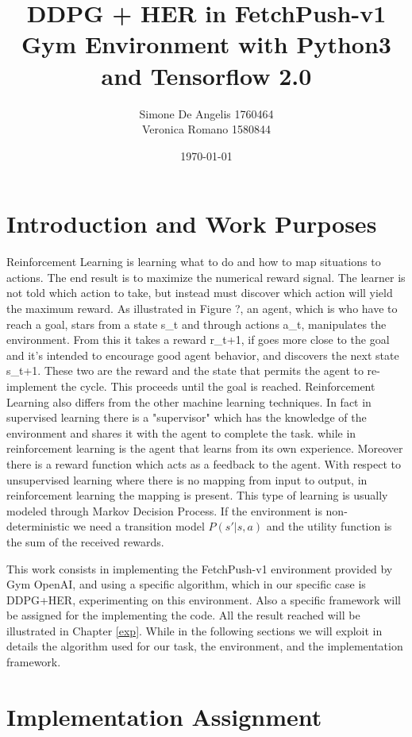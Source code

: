 \documentclass[a4paper]{report}
\title{DDPG + HER in FetchPush-v1 Gym Environment with Python3 and Tensorflow 2.0}
\author{Simone De Angelis 1760464\\ Veronica Romano 1580844}
\date{\today}
\begin{document}
\maketitle

\chapter{Introduction and Work Purposes}
Reinforcement Learning is learning what to do and how to map situations to actions. The end result is to maximize the numerical reward signal. The learner is not told which action to take, but instead must discover which action will yield the maximum reward.
As illustrated in Figure ?, an agent, which is who have to reach a goal, stars from a state s\_t and through actions a\_t, manipulates the environment. From this it takes a reward r\_t+1, if goes more close to the goal and it's intended to encourage good agent behavior, and discovers the next state s\_t+1. These two are the reward and the state that permits the agent to re-implement the cycle. This proceeds until the goal is reached. Reinforcement Learning also differs from the other machine learning techniques. In fact in supervised learning there is a "supervisor" which has the knowledge of the environment and shares it with the agent to complete the task. while in reinforcement learning is the agent that learns from its own experience. Moreover there is a reward function which acts as a feedback to the agent. With respect to unsupervised learning where there is no mapping from input to output, in reinforcement learning the mapping is present. This type of learning is usually modeled through Markov Decision Process. If the environment is non-deterministic we need a transition model $P(s'|s,a)$ and the utility function is the sum of the received rewards.

This work consists in implementing the FetchPush-v1 environment provided by Gym OpenAI, and using a specific algorithm, which in our specific case is DDPG+HER, experimenting on this environment. Also a specific framework will be assigned for the implementing the code. All the result reached will be illustrated in Chapter \ref{exp}. While in the following sections we will exploit in details the algorithm used for our task, the environment, and the implementation framework.


\chapter{Implementation Assignment}
\end{document}
